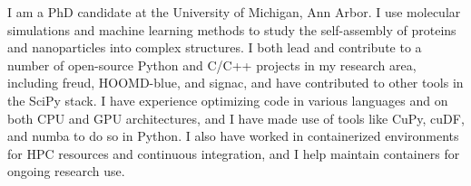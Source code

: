 
\begin{cvparagraph}
I am a PhD candidate at the University of Michigan, Ann Arbor.
I use molecular simulations and machine learning methods to study the self-assembly of proteins and nanoparticles into complex structures.
I both lead and contribute to a number of open-source Python and C/C++ projects in my research area, including freud, HOOMD-blue, and signac, and have contributed to other tools in the SciPy stack.
I have experience optimizing code in various languages and on both CPU and GPU architectures, and I have made use of tools like CuPy, cuDF, and numba to do so in Python.
I also have worked in containerized environments for HPC resources and continuous integration, and I help maintain containers for ongoing research use.
\end{cvparagraph}
